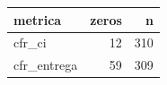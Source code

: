 \begin{tabular}{lrr}
\toprule
metrica & zeros & n \\
\midrule
cfr_ci & 12 & 310 \\
cfr_entrega & 59 & 309 \\
\bottomrule
\end{tabular}
